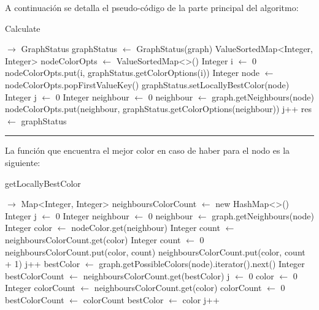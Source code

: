A continuaci\'on se detalla el pseudo-c\'odigo de la parte principal del algoritmo:

\begin{algorithm}[H]
\caption{Calculate}
\begin{algorithmic}[1]
{$\ensuremath{\rightarrow}$ }
\state GraphStatus graphStatus $\gets$ GraphStatus(graph)
\state ValueSortedMap<Integer, Integer> nodeColorOpts $\gets$ ValueSortedMap<>() 
\state Integer i $\gets$ 0
\state  nodeColorOpts.put(i, graphStatus.getColorOptions(i))
\state Integer node $\gets$ nodeColorOpts.popFirstValueKey()
\state graphStatus.setLocallyBestColor(node)
\state Integer j $\gets$ 0
\state Integer neighbour  $\gets$ 0
\state neighbour $\gets$ graph.getNeighbours(node)
\state nodeColorOpts.put(neighbour, graphStatus.getColorOptions(neighbour))
\endif
\state j++
\endwhile
\endwhile
\EndFor
\state res $\gets$ graphStatus
\EndFunction 
\end{algorithmic}
\hrule
{}
\end{algorithm}

La función que encuentra el mejor color en caso de haber para el nodo es la siguiente:\\

\begin{algorithm}[H]
\caption{getLocallyBestColor}
\begin{algorithmic}[1]
{$\ensuremath{\rightarrow}$ }
\state Map<Integer, Integer> neighboursColorCount $\gets$ new HashMap<>()
\state Integer j $\gets$ 0
\state Integer neighbour  $\gets$ 0
\state neighbour $\gets$ graph.getNeighbours(node)
\state Integer color $\gets$ nodeColor.get(neighbour)
\state Integer count $\gets$ neighboursColorCount.get(color)
\state Integer count $\gets$ 0
\state neighboursColorCount.put(color, count)
\endif
\state neighboursColorCount.put(color, count + 1)
\endif
\state j++
\endwhile
\state bestColor $\gets$ graph.getPossibleColors(node).iterator().next()
\state Integer bestColorCount $\gets$ neighboursColorCount.get(bestColor)
\state j $\gets$ 0
\state color $\gets$ 0
\state Integer colorCount $\gets$ neighboursColorCount.get(color)
\state colorCount $\gets$ 0
\endif
{} 
\state bestColorCount $\gets$ colorCount 
\state bestColor $\gets$ color
\endif
\state j++
\endwhile
\EndFunction 
\end{algorithmic}
\end{algorithm}

